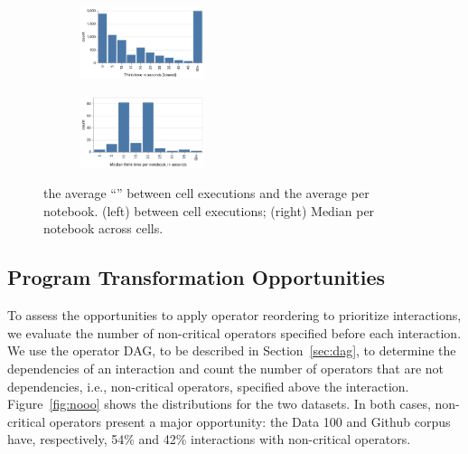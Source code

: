 \begin{figure}[h!]
     \centering
     \begin{subfigure}%
         \centering
         \includegraphics[width=0.4\textwidth]{submissions/interactivity/figures/ds_think_cell_v2.pdf}
     \end{subfigure}
    \hfill
     \begin{subfigure}%
         \centering
         \includegraphics[width=0.4\textwidth]{submissions/interactivity/figures/ds_think_nb_v2.pdf}
     \end{subfigure}
        \caption{\Thinktime the average ``\thinktime'' between cell executions and the average \thinktime per notebook. (left) \Thinktime between cell executions; (right) Median \thinktime per notebook across cells.}
        \label{fig:think}
\end{figure}


\subsection{Program Transformation Opportunities}

 To assess the opportunities to apply operator reordering to prioritize interactions, we evaluate the number of non-critical operators specified before each interaction.  We use the operator DAG, to be described in Section~\ref{sec:dag}, to determine the dependencies of an interaction and count the number of operators that are not dependencies, i.e., non-critical operators, specified above the interaction.
Figure~\ref{fig:nooo} shows the distributions for the two datasets.
In both cases, non-critical operators present a major opportunity: the Data 100 and Github corpus have, respectively, 54\% and 42\% interactions with non-critical operators.


